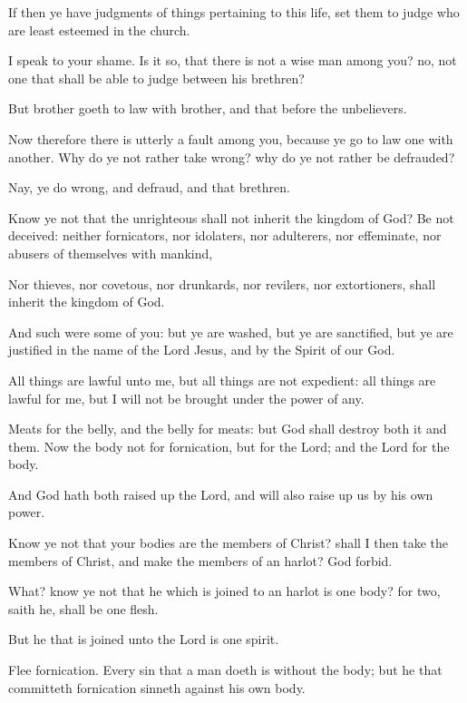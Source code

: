 {If
then ye
have
judgments of things pertaining to this
life,
set
them to judge who are least
esteemed
in the
church.

I
speak
to
your
shame. Is
it
so, that there is
not a
wise man
among
you? no,
not
one
that shall be
able to
judge
between
his
brethren?

But
brother goeth to
law
with
brother,
and
that
before the
unbelievers.

Now
therefore there
is
utterly a
fault
among
you,
because ye
go to
law one
with
another.
Why do
ye
not
rather take
wrong?
why do
ye
not
rather
{} be
defrauded?

Nay,
ye do
wrong,
and
defraud,
and
that
{}
brethren.

Know
ye
not
that the
unrighteous
shall
not
inherit the
kingdom of
God?
Be
not
deceived:
neither
fornicators,
nor
idolaters,
nor
adulterers,
nor
effeminate,
nor abusers of themselves with
mankind,

Nor
thieves,
nor
covetous,
nor
drunkards,
nor
revilers,
nor
extortioners,
shall
inherit the
kingdom of
God.

And
such
were some of
you:
but ye are
washed,
but ye are
sanctified,
but ye are
justified
in the
name of the
Lord
Jesus,
and
by the
Spirit of
our
God.


\par }{\PP {}All
things are
lawful unto
me,
but all
things
are
not
expedient: all
things are
lawful for
me,
but
I
will
not be brought under the
power
of
any.

Meats for the
belly,
and the
belly for
meats:
but
God shall
destroy
both
it
and
them.
Now the
body
{}
not for
fornication,
but for the
Lord;
and the
Lord for the
body.

And
God
hath
both raised
up the
Lord,
and will also raise
up
us
by his
own
power.

Know
ye
not
that
your
bodies
are the
members of
Christ? shall
I
then
take the
members of
Christ, and
make
{} the
members of an
harlot?
God
forbid.

What? know
ye
not
that he
which is
joined to an
harlot
is
one
body?
for
two, saith
he, shall
be
one
flesh.

But he
that is
joined unto the
Lord
is
one
spirit.

Flee
fornication.
Every
sin
that a
man
doeth
is
without the
body;
but he
that committeth
fornication
sinneth
against his
own
body.

}
